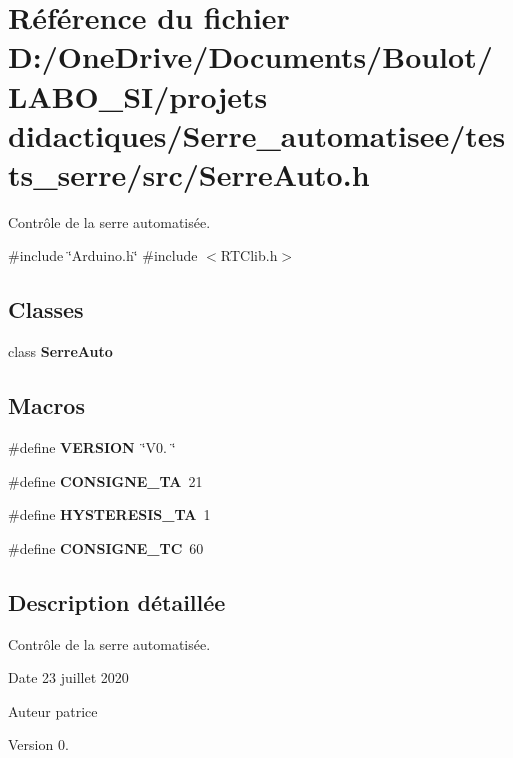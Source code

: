 \section{Référence du fichier D\+:/\+One\+Drive/\+Documents/\+Boulot/\+L\+A\+B\+O\+\_\+\+S\+I/projets didactiques/\+Serre\+\_\+automatisee/tests\+\_\+serre/src/\+Serre\+Auto.h}
\label{_serre_auto_8h}


Contrôle de la serre automatisée.  


{\ttfamily \#include \char`\"{}Arduino.\+h\char`\"{}}\newline
{\ttfamily \#include $<$R\+T\+Clib.\+h$>$}\newline
\subsection*{Classes}
\begin{DoxyCompactItemize}
\item 
class \textbf{ Serre\+Auto}
\end{DoxyCompactItemize}
\subsection*{Macros}
\begin{DoxyCompactItemize}
\item 
\#define \textbf{ V\+E\+R\+S\+I\+ON}~\char`\"{}V0. \char`\"{}
\item 
\#define \textbf{ C\+O\+N\+S\+I\+G\+N\+E\+\_\+\+TA}~21
\item 
\#define \textbf{ H\+Y\+S\+T\+E\+R\+E\+S\+I\+S\+\_\+\+TA}~1
\item 
\#define \textbf{ C\+O\+N\+S\+I\+G\+N\+E\+\_\+\+TC}~60
\end{DoxyCompactItemize}


\subsection{Description détaillée}
Contrôle de la serre automatisée. 

\begin{DoxyDate}{Date}
23 juillet 2020 
\end{DoxyDate}
\begin{DoxyAuthor}{Auteur}
patrice 
\end{DoxyAuthor}
\begin{DoxyVersion}{Version}
0. 
\end{DoxyVersion}



